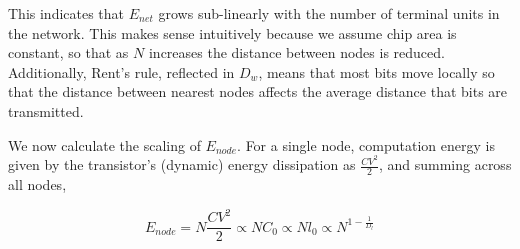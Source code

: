 \documentclass[12pt]{article}
\begin{document}


This indicates that $E_{net}$ grows sub-linearly with the number of terminal
units in the network. This makes sense intuitively because we assume chip area
is constant, so that as $N$ increases the distance between nodes is reduced.
Additionally, Rent's rule, reflected in $D_w$, means that most bits move
locally so that the distance between nearest nodes affects the average
distance that bits are transmitted.   


We now calculate the scaling of $E_{node}$. For a single node, computation
energy is given by the transistor's (dynamic) energy dissipation as
$\frac{CV^2}{2}$, and summing across all nodes,


\begin{equation}
  E_{node} = N\frac{CV^2}{2} \propto NC_0 \propto N l_0 \propto
  N^{1-\frac{1}{D_l}}
\end{equation}





\end{document}
